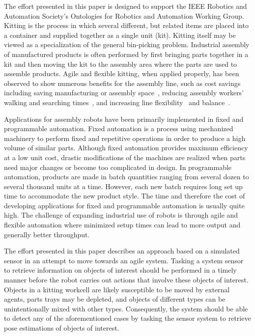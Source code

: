 The effort presented in this paper is designed to support the IEEE Robotics and Automation Society's Ontologies for Robotics and Automation Working Group. Kitting is the process in which several different, but related items are placed into a container and supplied together as a single unit (kit). Kitting itself may be viewed as a specialization of the general bin-picking problem. Industrial assembly of manufactured products is often performed by first bringing parts together in a kit and then moving the kit to the assembly area where the parts are used to assemble products. Agile and flexible kitting, when applied properly, has been observed to show numerous benefits for the assembly line, such as cost savings~\cite{Carlsson_2008} including saving manufacturing or assembly space~\cite{Medbo2003}, reducing assembly workers' walking and searching times~\cite{Schwind1992}, and increasing line flexibility~\cite{Bozer1992} and balance~\cite{Jiao2000}.

Applications for assembly robots have been primarily implemented in fixed and programmable automation. Fixed automation is a process using mechanized machinery to perform fixed and repetitive operations in order to produce a high volume of similar parts. Although fixed automation provides maximum efficiency at a low unit cost, drastic modifications of the machines are realized when parts need major changes or become too complicated in design. In programmable automation, products are made in batch quantities ranging from several dozen to several thousand units at a time. However, each new batch requires long set up time to accommodate the new product style. The time and therefore the cost of developing applications for fixed and programmable automation is usually quite high. The challenge of expanding industrial use of robots is through agile and flexible automation where minimized setup times can lead to more output and generally better throughput.

The effort presented in this paper describes an approach based on a simulated sensor in an attempt to move towards an agile system. Tasking a system sensor to retrieve information on objects of interest should be performed in a timely manner before the robot carries out actions that involve these objects of interest. Objects in a kitting workcell are likely susceptible to be moved by external agents, parts trays may be depleted, and objects of different types can be unintentionally mixed with other types. Consequently, the system should be able to detect any of the aforementioned cases by tasking the sensor system to retrieve pose estimations of objects of interest.

